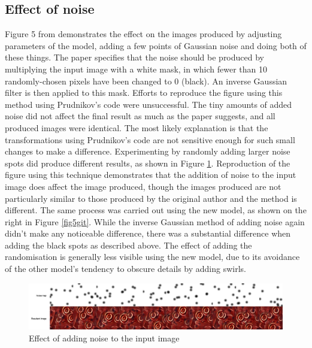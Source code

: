 \documentclass{article} %
\begin{document}
\subsection{Effect of noise}\label{ss:noise}
Figure 5 from \cite{babaeizadeh2018adjustable} demonstrates the effect on the images produced by adjusting parameters of the model, adding a few points of Gaussian noise and doing both of these things. The paper specifies that the noise should be produced by multiplying the input image with a white mask, in which fewer than 10 randomly-chosen pixels have been changed to 0 (black). An inverse Gaussian filter is then applied to this mask. Efforts to reproduce the figure using this method using Prudnikov's code were unsuccessful. The tiny amounts of added noise did not affect the final result as much as the paper suggests, and all produced images were identical. The most likely explanation is that the transformations using Prudnikov's code are not sensitive enough for such small changes to make a difference. Experimenting by randomly adding larger noise spots did produce different results, as shown in Figure \ref{gaussnoise}. Reproduction of the figure using this technique demonstrates that the addition of noise to the input image does affect the image produced, though the images produced are not particularly similar to those produced by the original author and the method is different. The same process was carried out using the new model, as shown on the right in Figure \ref{fig5git}. While the inverse Gaussian method of adding noise again didn't make any noticeable difference, there was a substantial difference when adding the black spots as described above. The effect of adding the randomisation is generally less visible using the new model, due to its avoidance of the other model's tendency to obscure details by adding swirls.

\begin{figure}[h!]
    \centering
    \includegraphics[width=\textwidth, scale=0.1]{non_gauss2.png}
    \vspace{-7mm}
    \caption{Effect of adding noise to the input image}
    \label{gaussnoise}
\end{figure}
\end{document}
